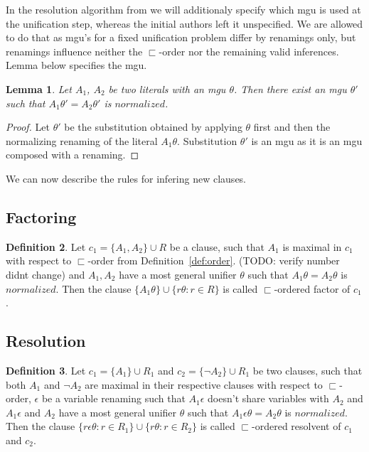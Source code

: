\documentclass[english, shortabstract]{iithesis}
\theoremstyle{definition} \newtheorem{definition}{Definition}[chapter]
\theoremstyle{remark} \newtheorem{remark}[definition]{Observation}
\theoremstyle{plain} \newtheorem{theorem}[definition]{Theorem}
\theoremstyle{plain} \newtheorem{lemma}[definition]{Lemma}
\begin{document}
In the resolution algorithm from \cite{resolution gf} we will additionaly specify which mgu is used at the unification step,
whereas the initial authors left it unspecified.
We are allowed to do that as mgu's for a fixed unification problem differ by renamings only,
but renamings influence neither the $\sqsubset$-order nor the remaining valid inferences.
Lemma below specifies the mgu.
\begin{lemma}
Let $A_1$, $A_2$ be two literals with an mgu $\theta$.
Then there exist an mgu $\theta'$ such that $A_1\theta'=A_2\theta'$ is $normalized$.
\end{lemma}
\begin{proof}
Let $\theta'$ be the substitution obtained by applying $\theta$ first and then the normalizing renaming of the literal $A_1\theta$.
Substitution $\theta'$ is an mgu as it is an mgu composed with a renaming.
\end{proof}

We can now describe the rules for infering new clauses.

\subsection{Factoring}

\begin{definition}\label{def:factoring}
Let $c_1=\{A_1, A_2\} \cup R$ be a clause,
such that $A_1$ is maximal in $c_1$ with respect to $\sqsubset$-order from Definition~\ref{def:order}. (TODO: verify number didnt change)
and $A_1, A_2$ have a most general unifier $\theta$ such that $A_1\theta=A_2\theta$ is $normalized$.
Then the clause $\{A_1\theta\}\cup \{r\theta : r \in R\}$ is called $\sqsubset$-ordered factor of $c_1$.
\end{definition}

\subsection{Resolution}

\begin{definition}\label{def:resolution}
Let $c_1=\{A_1\} \cup R_1$ and $c_2=\{\lnot A_2\} \cup R_1$ be two clauses,
such that both $A_1$ and $\lnot A_2$ are maximal in their respective clauses with respect to $\sqsubset$-order,
$\epsilon$ be a variable renaming such that $A_1\epsilon$ doesn't share variables with $A_2$
and $A_1\epsilon$ and $A_2$ have a most general unifier $\theta$ such that $A_1\epsilon\theta=A_2\theta$ is $normalized$.
Then the clause $\{r\epsilon\theta : r \in R_1\} \cup \{r\theta : r \in R_2\}$ is called $\sqsubset$-ordered resolvent of $c_1$ and $c_2$.
\end{definition}
\end{document}
